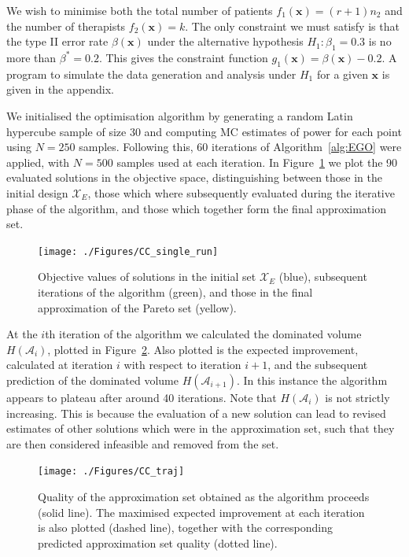 \documentclass{article} %
\begin{document}

We wish to minimise both the total number of patients $f_{1}(\mathbf{x}) = (r+1)n_{2}$ and the number of therapists $f_{2}(\mathbf{x}) = k$. The only constraint we must satisfy is that the type II error rate $\beta(\mathbf{x})$ under the alternative hypothesis $H_{1}: \beta_{1} = 0.3$ is no more than $\beta^{*} = 0.2$. This gives the constraint function $g_{1}(\mathbf{x}) = \beta(\mathbf{x}) - 0.2$. A program to simulate the data generation and analysis under $H_{1}$ for a given $\mathbf{x}$ is given in the appendix.

We initialised the optimisation algorithm by generating a random Latin hypercube sample of size 30 and computing MC estimates of power for each point using $N = 250$ samples. Following this, 60 iterations of Algorithm~\ref{alg:EGO} were applied, with $N = 500$ samples used at each iteration. In Figure~\ref{fig:CC_single_run} we plot the 90 evaluated solutions in the objective space, distinguishing between those in the initial design $\mathcal{X}_{E}$, those which where subsequently evaluated during the iterative phase of the algorithm, and those which together form the final approximation set.

\begin{figure}
\centering
\texttt{[image: ./Figures/CC\_single\_run]}
\caption{Objective values of solutions in the initial set $\mathcal{X}_{E}$ (blue), subsequent iterations of the algorithm (green), and those in the final approximation of the Pareto set (yellow).}
\label{fig:CC_single_run}
\end{figure}

At the $i$th iteration of the algorithm we calculated the dominated volume $H(\mathcal{A}_{i})$, plotted in Figure~\ref{fig:CC_traj}. Also plotted is the expected improvement, calculated at iteration $i$ with respect to iteration $i+1$, and the subsequent prediction of the dominated volume $H(\mathcal{A}_{i+1})$. In this instance the algorithm appears to plateau after around 40 iterations. Note that $H(\mathcal{A}_{i})$ is not strictly increasing. This is because the evaluation of a new solution can lead to revised estimates of other solutions which were in the approximation set, such that they are then considered infeasible and removed from the set. 

\begin{figure}
\centering
\texttt{[image: ./Figures/CC\_traj]}
\caption{Quality of the approximation set obtained as the algorithm proceeds (solid line). The maximised expected improvement at each iteration is also plotted (dashed line), together with the corresponding predicted approximation set quality (dotted line).}
\label{fig:CC_traj}
\end{figure}
\end{document}
